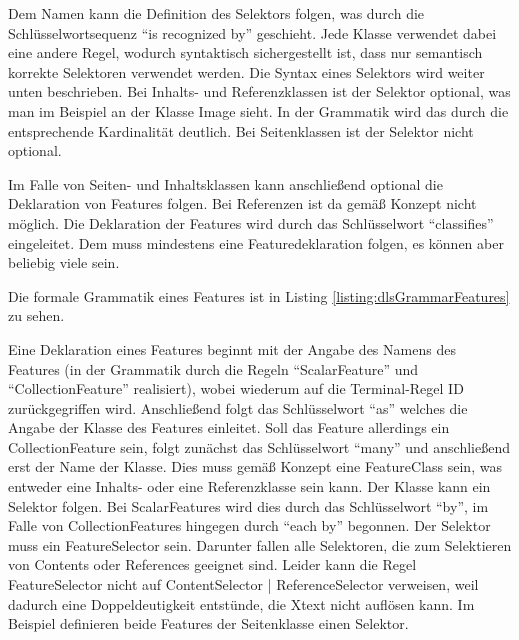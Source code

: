    Dem Namen kann die Definition des Selektors folgen,
    was durch die Schlüsselwortsequenz "`is recognized by"' geschieht.
    Jede Klasse verwendet dabei eine andere Regel,
    wodurch syntaktisch sichergestellt ist, dass nur semantisch korrekte Selektoren
    verwendet werden.
    Die Syntax eines Selektors wird weiter unten beschrieben.
    Bei Inhalts- und Referenzklassen ist der Selektor optional,
    was man im Beispiel an der Klasse Image sieht.
    In der Grammatik wird das durch die entsprechende Kardinalität deutlich.
    Bei Seitenklassen ist der Selektor nicht optional.
    
    Im Falle von Seiten- und Inhaltsklassen kann anschließend optional die Deklaration von Features folgen.
    Bei Referenzen ist da gemäß Konzept nicht möglich.
    Die Deklaration der Features wird durch das Schlüsselwort "`classifies"' eingeleitet.
    Dem muss mindestens eine Featuredeklaration folgen, es können aber beliebig viele sein.

    Die formale Grammatik eines Features ist in Listing \ref{listing:dlsGrammarFeatures} zu sehen.

    

    Eine Deklaration eines Features beginnt mit der Angabe des Namens des Features
    (in der Grammatik durch die Regeln "`ScalarFeature"' und "`CollectionFeature"' realisiert),
    wobei wiederum auf die Terminal-Regel ID zurückgegriffen wird.
    Anschließend folgt das Schlüsselwort "`as"' welches die Angabe der Klasse
    des Features einleitet.
    Soll das Feature allerdings ein CollectionFeature sein, folgt zunächst das
    Schlüsselwort "`many"' und anschließend erst der Name der Klasse.
    Dies muss gemäß Konzept eine FeatureClass sein, was entweder eine
    Inhalts- oder eine Referenzklasse sein kann.
    Der Klasse kann ein Selektor folgen.
    Bei ScalarFeatures wird dies durch das Schlüsselwort "`by"',
    im Falle von CollectionFeatures hingegen durch "`each by"' begonnen.
    Der Selektor muss ein FeatureSelector sein.
    Darunter fallen alle Selektoren, die zum Selektieren von Contents oder References geeignet sind.
    Leider kann die Regel FeatureSelector nicht auf ContentSelector | ReferenceSelector verweisen,
    weil dadurch eine Doppeldeutigkeit entstünde, die Xtext nicht auflösen kann.
    Im Beispiel definieren beide Features der Seitenklasse einen Selektor.

